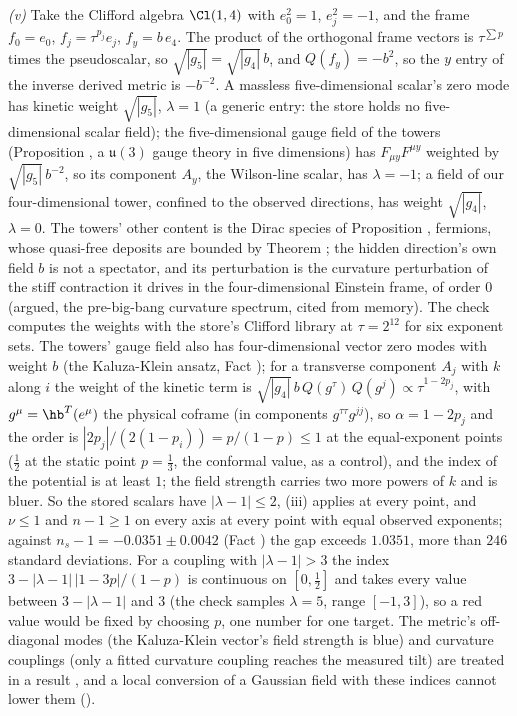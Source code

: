 \emph{(v)} Take the Clifford algebra $\Cl(1,4)$ with $e_{0}^{2} = 1$, $e_{j}^{2} = -1$, and the frame $f_{0} = e_{0}$, $f_{j} = \tau^{p_{j}}e_{j}$, $f_{y} = b\,e_{4}$. The product of the orthogonal frame vectors is $\tau^{\sum p}$ times the pseudoscalar, so $\sqrt{|g_{5}|} = \sqrt{|g_{4}|}\,b$, and $Q(f_{y}) = -b^{2}$, so the $y$ entry of the inverse derived metric is $-b^{-2}$. A massless five-dimensional scalar's zero mode has kinetic weight $\sqrt{|g_{5}|}$, $\lambda = 1$ (a generic entry: the store holds no five-dimensional scalar field); the five-dimensional gauge field of the towers (Proposition , a $\mathfrak{u}(3)$ gauge theory in five dimensions) has $F_{\mu y}F^{\mu y}$ weighted by $\sqrt{|g_{5}|}\,b^{-2}$, so its component $A_{y}$, the Wilson-line scalar, has $\lambda = -1$; a field of our four-dimensional tower, confined to the observed directions, has weight $\sqrt{|g_{4}|}$, $\lambda = 0$. The towers' other content is the Dirac species of Proposition , fermions, whose quasi-free deposits are bounded by Theorem ; the hidden direction's own field $b$ is not a spectator, and its perturbation is the curvature perturbation of the stiff contraction it drives in the four-dimensional Einstein frame, of order $0$ (argued, the pre-big-bang curvature spectrum, cited from memory). The check computes the weights with the store's Clifford library at $\tau = 2^{12}$ for six exponent sets. The towers' gauge field also has four-dimensional vector zero modes with weight $b$ (the Kaluza-Klein ansatz, Fact ); for a transverse component $A_{j}$ with $k$ along $i$ the weight of the kinetic term is $\sqrt{|g_{4}|}\,b\,Q(g^{\tau})\,Q(g^{j}) \propto \tau^{1 - 2p_{j}}$, with $g^{\mu} = \hb^{T}(e^{\mu})$ the physical coframe (in components $g^{\tau\tau}g^{jj}$), so $\alpha = 1 - 2p_{j}$ and the order is $|2p_{j}|/(2(1 - p_{i})) = p/(1 - p) \le 1$ at the equal-exponent points ($\tfrac12$ at the static point $p = \tfrac13$, the conformal value, as a control), and the index of the potential is at least $1$; the field strength carries two more powers of $k$ and is bluer. So the stored scalars have $|\lambda - 1| \le 2$, (iii) applies at every point, and $\nu \le 1$ and $n - 1 \ge 1$ on every axis at every point with equal observed exponents; against $n_{s} - 1 = -0.0351 \pm 0.0042$ (Fact ) the gap exceeds $1.0351$, more than $246$ standard deviations. For a coupling with $|\lambda - 1| > 3$ the index $3 - |\lambda - 1|\,|1 - 3p|/(1 - p)$ is continuous on $[0, \tfrac12]$ and takes every value between $3 - |\lambda - 1|$ and $3$ (the check samples $\lambda = 5$, range $[-1, 3]$), so a red value would be fixed by choosing $p$, one number for one target. The metric's off-diagonal modes (the Kaluza-Klein vector's field strength is blue) and curvature couplings (only a fitted curvature coupling reaches the measured tilt) are treated in a result , and a local conversion of a Gaussian field with these indices cannot lower them ().
